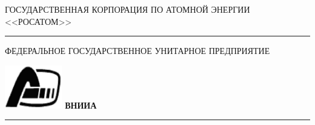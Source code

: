 \documentclass[a4paper,12pt]{article}
\begin{document}
\def\oldbibitem{} \let\oldbibitem=\bibitem
\def\bibitem{\stepcounter{citnum}\oldbibitem}
\sloppy                             %
\sloppy                             %
\titlepage
\begin{center}
ГОСУДАРСТВЕННАЯ КОРПОРАЦИЯ ПО АТОМНОЙ ЭНЕРГИИ <<РОСАТОМ>>
\end{center}

\vspace{.15cm}

\hrule height 1.5pt

\vspace{.2cm}

\hspace{6cm} \scriptsize{ФЕДЕРАЛЬНОЕ ГОСУДАРСТВЕННОЕ УНИТАРНОЕ ПРЕДПРИЯТИЕ}

\hspace{-.65cm}\includegraphics[width=2.5cm]{images/Logotip} \hspace{0.2cm}\vspace{-0.5cm}\Huge{\bfseries ВНИИА}
\vspace{-1.7cm}\small
\begin{center}
\hspace{6.5cm}{\bfseries ВСЕРОССИЙСКИЙ}

\hspace{6.5cm}{\bfseries НАУЧНО-ИССЛЕДОВАТЕЛЬСКИЙ ИНСТИТУТ}

\hspace{6.5cm}{\bfseries АВТОМАТИКИ }

\hspace{6.5cm}{\bfseries им. Н.Л. ДУХОВА}
\end{center}

\hrule height 1.5pt

\normalsize

\begin{flushright}


\vspace{.2cm}


\end{flushright}
\end{document}
